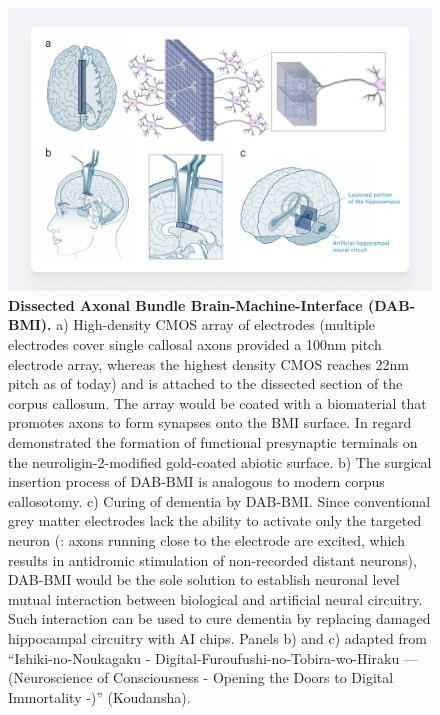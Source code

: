 \documentclass[10pt]{article}
\begin{document}
\begin{sloppypar}
  \begin{figure}[ht!]
    \centering
    \includegraphics[width=\textwidth]{figures/masa-approach-1.png}
    \caption[CHI: Dissected Axonal Bundle Brain-Machine-Interface]{\textbf{Dissected Axonal Bundle Brain-Machine-Interface (DAB-BMI).} a) High-density CMOS array of electrodes (multiple electrodes cover single callosal axons provided a 100nm pitch electrode array, whereas the highest density CMOS reaches 22nm pitch as of today) and is attached to the dissected section of the corpus callosum. The array would be coated with a biomaterial that promotes axons to form synapses onto the BMI surface. In regard \cite{cho2024site} demonstrated the formation of functional presynaptic terminals on the neuroligin-2-modified gold-coated abiotic surface. b) The surgical insertion process of DAB-BMI is analogous to modern corpus callosotomy. c) Curing of dementia by DAB-BMI. Since conventional grey matter electrodes lack the ability to activate only the targeted neuron (\cite{histed2009direct}: axons running close to the electrode are excited, which results in antidromic stimulation of non-recorded distant neurons), DAB-BMI would be the sole solution to establish neuronal level mutual interaction between biological and artificial neural circuitry. Such interaction can be used to cure dementia by replacing damaged hippocampal circuitry with AI chips. Panels b) and c) adapted from “Ishiki-no-Noukagaku - Digital-Furoufushi-no-Tobira-wo-Hiraku — (Neuroscience of Consciousness - Opening the Doors to Digital Immortality -)” (Koudansha).}
    \label{fig:masa-approach-1}
  \end{figure}


\end{sloppypar}
\end{document}
